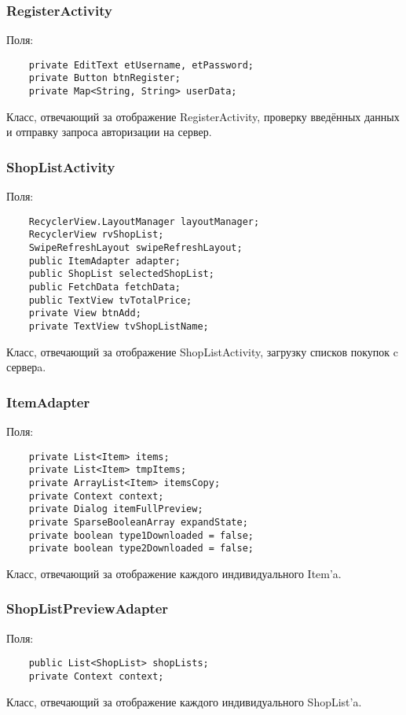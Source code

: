 \subsubsection{RegisterActivity}
Поля:\\
\begin{small}
    \begin{verbatim}
    private EditText etUsername, etPassword;
    private Button btnRegister;
    private Map<String, String> userData;
    \end{verbatim}
\end{small}
Класс, отвечающий за отображение RegisterActivity, проверку введённых данных и отправку запроса авторизации на сервер.

\subsubsection{ShopListActivity}
Поля:\\
\begin{small}
    \begin{verbatim}
    RecyclerView.LayoutManager layoutManager;
    RecyclerView rvShopList;
    SwipeRefreshLayout swipeRefreshLayout;
    public ItemAdapter adapter;
    public ShopList selectedShopList;
    public FetchData fetchData;
    public TextView tvTotalPrice;
    private View btnAdd;
    private TextView tvShopListName;
    \end{verbatim}
\end{small}
Класс, отвечающий за отображение ShopListActivity, загрузку списков покупок c серверa.


\subsubsection{ItemAdapter}
Поля:\\
\begin{small}
    \begin{verbatim}
    private List<Item> items;
    private List<Item> tmpItems;
    private ArrayList<Item> itemsCopy;
    private Context context;
    private Dialog itemFullPreview;
    private SparseBooleanArray expandState;
    private boolean type1Downloaded = false;
    private boolean type2Downloaded = false;
        \end{verbatim}
\end{small}
Класс, отвечающий за отображение каждого индивидуального Item'a.

\subsubsection{ShopListPreviewAdapter}
 Поля:\\
\begin{small}
    \begin{verbatim}
    public List<ShopList> shopLists;
    private Context context;
    \end{verbatim}
\end{small}
Класс, отвечающий за отображение каждого индивидуального ShopList'a.

